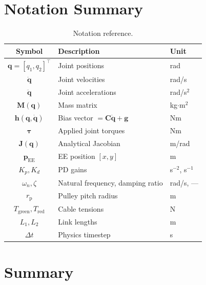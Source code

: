 \documentclass[11pt,a4paper]{article}
\newcommand{\rp}{r_{\mathrm{p}}}
\newcommand{\bq}{\bm{q}}
\newcommand{\bdq}{\dot{\bm{q}}}
\newcommand{\bddq}{\ddot{\bm{q}}}
\newcommand{\btau}{\bm{\tau}}
\newcommand{\bM}{\bm{M}}
\newcommand{\bh}{\bm{h}}
\newcommand{\bJ}{\bm{J}}
\begin{document}
\section{Notation Summary}
\label{sec:notation}

\begin{table}[h]
\centering
\caption{Notation reference.}
\begin{tabular}{cll}
\toprule
\textbf{Symbol} & \textbf{Description} & \textbf{Unit} \\
\midrule
$\bq = [q_1, q_2]^\top$ & Joint positions & rad \\
$\bdq$ & Joint velocities & rad/s \\
$\bddq$ & Joint accelerations & rad/s$^2$ \\
$\bM(\bq)$ & Mass matrix & kg$\cdot$m$^2$ \\
$\bh(\bq, \bdq)$ & Bias vector $= \bm{C}\bdq + \bm{g}$ & Nm \\
$\btau$ & Applied joint torques & Nm \\
$\bJ(\bq)$ & Analytical Jacobian & m/rad \\
$\bm{p}_{\mathrm{EE}}$ & EE position $[x, y]$ & m \\
$K_p, K_d$ & PD gains & s$^{-2}$, s$^{-1}$ \\
$\omega_n, \zeta$ & Natural frequency, damping ratio & rad/s, --- \\
$\rp$ & Pulley pitch radius & m \\
$T_{\mathrm{green}}, T_{\mathrm{red}}$ & Cable tensions & N \\
$L_1, L_2$ & Link lengths & m \\
$\Delta t$ & Physics timestep & s \\
\bottomrule
\end{tabular}
\end{table}


\section{Summary}
\end{document}
